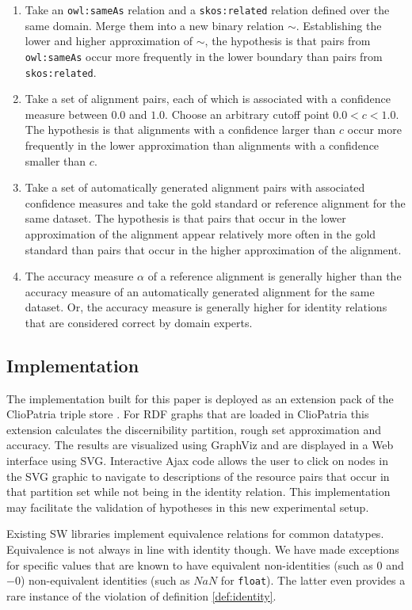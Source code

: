 \begin{enumerate}
\item Take an \verb|owl:sameAs| relation and a \verb|skos:related|
        relation defined over the same domain.
      Merge them into a new binary relation $\sim$.
      Establishing the lower and higher approximation of $\sim$,
        the hypothesis is that pairs from \verb|owl:sameAs| occur more
        frequently in the lower boundary than pairs from \verb|skos:related|.
\item Take a set of alignment pairs, each of which is associated with
        a confidence measure between $0.0$ and $1.0$.
      Choose an arbitrary cutoff point $0.0<c<1.0$.
      The hypothesis is that alignments with a confidence larger than $c$
        occur more frequently in the lower approximation than alignments
        with a confidence smaller than $c$.
\item Take a set of automatically generated alignment pairs with
        associated confidence measures and take the gold standard or
        reference alignment for the same dataset.
      The hypothesis is that pairs that occur in the lower approximation
        of the alignment appear relatively more often in the gold standard
        than pairs that occur in the higher approximation of the alignment.
\item The accuracy measure $\alpha$ of a reference alignment is generally
        higher than the accuracy measure of an automatically generated
        alignment for the same dataset.
      Or, the accuracy measure is generally higher for identity relations
        that are considered correct by domain experts.
\end{enumerate}

\subsection{Implementation}
\label{sec:implementation}

The implementation built for this paper is deployed as an extension pack
  of the ClioPatria triple store \cite{schreiber_2006}.
For RDF graphs that are loaded in ClioPatria this extension calculates
  the discernibility partition, rough set approximation and accuracy.
The results are visualized using GraphViz and are displayed in a
  Web interface using SVG.
Interactive Ajax code allows the user to click on nodes in the SVG graphic
  to navigate to descriptions of the resource pairs that occur in
  that partition set while not being in the identity relation.
This implementation may facilitate the validation of hypotheses in this
  new experimental setup.

Existing SW libraries implement equivalence relations for common datatypes.
Equivalence is not always in line with identity though.
We have made exceptions for specific values that are known to have
  equivalent non-identities (such as $0$ and $-0$)
  non-equivalent identities (such as $NaN$ for \texttt{float}).\cite{XSD11}
The latter even provides a rare instance of the violation of
  definition \ref{def:identity}.

